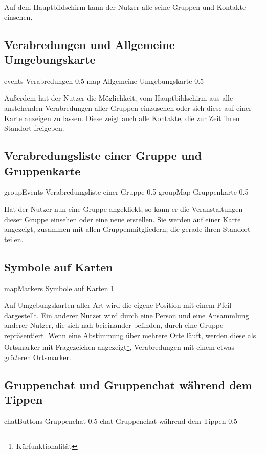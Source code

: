 \documentclass[parskip=full,11pt]{scrartcl}
\begin{document}
Auf dem Hauptbildschirm kann der Nutzer alle seine Gruppen und Kontakte einsehen.

\pagebreak
\subsection{Verabredungen und Allgemeine Umgebungskarte}
{events}
{Verabredungen}
{0.5}
{map}
{Allgemeine Umgebungskarte}
{0.5}

Außerdem hat der Nutzer die Möglichkeit, vom Hauptbildschirm aus alle anstehenden Verabredungen aller Gruppen einzusehen oder sich diese auf einer Karte anzeigen zu lassen. 
Diese zeigt auch alle Kontakte, die zur Zeit ihren Standort freigeben.

\pagebreak
\subsection{Verabredungsliste einer Gruppe und Gruppenkarte}
{groupEvents}
{Verabredungsliste einer Gruppe}
{0.5}
{groupMap}
{Gruppenkarte}
{0.5}

Hat der Nutzer nun eine Gruppe angeklickt, so kann er die Veranstaltungen dieser Gruppe einsehen oder eine neue erstellen.
Sie werden auf einer Karte angezeigt, zusammen mit allen Gruppenmitgliedern, die gerade ihren Standort teilen.

\pagebreak
\subsection{Symbole auf Karten}
{mapMarkers}
{Symbole auf Karten}
{1}

Auf Umgebungskarten aller Art wird die eigene Position mit einem Pfeil dargestellt. 
Ein anderer Nutzer wird durch eine Person und eine Ansammlung anderer Nutzer, die sich nah beieinander befinden, durch eine Gruppe repräsentiert.
Wenn eine Abstimmung über mehrere Orte läuft, werden diese als Ortsmarker mit Fragezeichen angezeigt\footnote[1]{Kürfunktionalität}, Verabredungen mit einem etwas größeren Ortsmarker.

\pagebreak
\subsection{Gruppenchat und Gruppenchat während dem Tippen}
{chatButtons}
{Gruppenchat}
{0.5}
{chat}
{Gruppenchat während dem Tippen}
{0.5}
\end{document}
